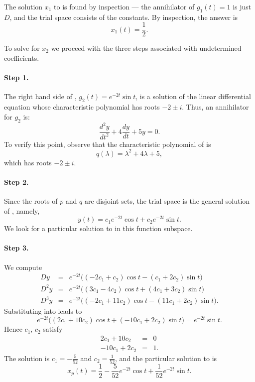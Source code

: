 The solution $x_1$ to  is found by inspection --- the 
annihilator of $g_1(t)=1$ is just $D$, 
and the trial space consists of 
the constants.  By inspection, the answer is 
\[
x_1(t) = \frac{1}{2}.
\]

To solve  for $x_2$ we proceed with the three steps 
associated with undetermined coefficients.

\paragraph{Step 1.} The right hand side of , 
$g_2(t)=e^{-2t}\sin t$, is a solution of the linear differential equation 
whose characteristic polynomial has roots $-2\pm i$.  Thus, an 
annihilator for $g_2$ is:
\begin{equation}  \label{eq:undetcoeffex2}
\frac{d^2y}{dt^2} +4\frac{dy}{dt} +5y = 0.
\end{equation}
To verify this point, observe that the characteristic 
polynomial of  
 is
\[
q(\lambda) = \lambda^2 + 4\lambda +5,
\]
which has roots $-2\pm i$.  

\paragraph{Step 2.} Since the roots of $p$ and $q$ are disjoint sets, the 
trial space is the general solution of 
, namely,  
\[
y(t) = c_1e^{-2t}\cos t + c_2 e^{-2t}\sin t.
\]
We look for a particular solution to  in this function 
subspace.

\paragraph{Step 3.} We compute
\begin{eqnarray*}
Dy   & = & e^{-2t}\Big((-2c_1+  c_2)\cos t - (  c_1+2c_2)\sin t\Big)\\
D^2y & = & e^{-2t}\Big(( 3c_1- 4c_2)\cos t + ( 4c_1+3c_2)\sin t\Big)\\
D^3y & = & e^{-2t}\Big((-2c_1+11c_2)\cos t - (11c_1+2c_2)\sin t\Big).
\end{eqnarray*}
Substituting into  leads to 
\[
e^{-2t}\Big( (2c_1+10c_2)\cos t +(-10c_1+2c_2)\sin t\Big) = 
e^{-2t}\sin t.
\]
Hence $c_1$, $c_2$ satisfy
\begin{eqnarray*}
  2c_1 +10c_2 & = & 0\\
-10c_1 + 2c_2 & = & 1.
\end{eqnarray*}
The solution is $c_1=-\frac{5}{52}$ and $c_2=\frac{1}{52}$, and
the particular solution to  
is
\[
x_p(t) = \frac{1}{2} - \frac{5}{52}e^{-2t}\cos t + \frac{1}{52}e^{-2t}\sin t.
\]


